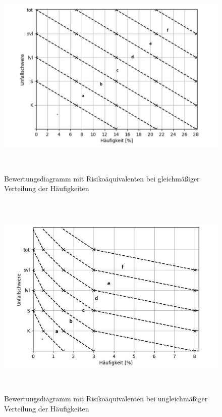 \begin{savenotes}
	\begin{figure}[H]
		\centering
		\includegraphics[width=15cm,height=10cm]{figures/Bewertungsdiagramm}
		\caption[Bewertungsdiagramm mit Risikoäquivalenten bei gleichmäßiger Verteilung der Häufigkeiten]{Bewertungsdiagramm mit Risikoäquivalenten bei gleichmäßiger Verteilung der Häufigkeiten}\label{fig:Bewertungsdiagramm}
	\end{figure}
\end{savenotes}

\begin{savenotes}
	\begin{figure}[H]
		\centering
		\includegraphics[width=15cm,height=10cm]{figures/Bewertungsdiagramm(2)}
		\caption[Bewertungsdiagramm mit Risikoäquivalenten bei ungleichmäßiger Verteilung der Häufigkeiten]{Bewertungsdiagramm mit Risikoäquivalenten bei ungleichmäßiger Verteilung der Häufigkeiten}\label{fig:Bewertungsdiagramm(2)}
	\end{figure}
\end{savenotes}



